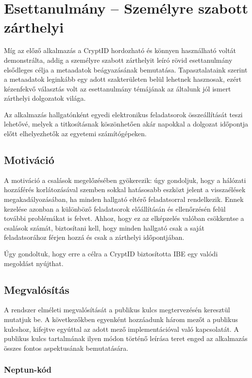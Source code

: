 \section{Esettanulmány – Személyre szabott zárthelyi}
\label{Section::Applications::Zarthelyi}

Míg az előző alkalmazás a CryptID hordozható és könnyen használható voltát demonstrálta, addig a személyre szabott zárthelyit leíró rövid esettanulmány elsődleges célja a metaadatok beágyazásának bemutatása. Tapasztalataink szerint a metaadatok leginkább egy adott szakterületen belül lehetnek hasznosak, ezért kézenfekvő választás volt az esettanulmány témájának az általunk jól ismert zárthelyi dolgozatok világa.

Az alkalmazás hallgatónként egyedi elektronikus feladatsorok összeállítását teszi lehetővé, melyek a titkosításnak köszönhetően akár napokkal a dolgozat időpontja előtt elhelyezhetők az egyetemi számítógépeken.

\subsection{Motiváció}

A motiváció a csalások megelőzésében gyökerezik: úgy gondoljuk, hogy a hálózati hozzáférés korlátozásával szemben sokkal hatásosabb eszközt jelent a visszaélések megakadályozásában, ha minden hallgató eltérő feladatsorral rendelkezik. Ennek kezelése azonban a különböző feladatsorok előállításán és ellenőrzésén felül további problémákat is felvet. Ahhoz, hogy ez az elképzelés valóban csökkentse a csalások számát, biztosítani kell, hogy minden hallgató csak a saját feladatsorához férjen hozzá és csak a zárthelyi időpontjában. 

Úgy gondoltuk, hogy erre a célra a CryptID biztosította IBE egy valódi megoldást nyújthat.

\subsection{Megvalósítás}

A rendszer elméleti megvalósítását a publikus kulcs megtervezésén keresztül mutatjuk be. A következőkben egyenként hozzáadunk három mezőt a publikus kulcshoz, kifejtve egyúttal az adott mező implementációval való kapcsolatát. A publikus kulcs tartalmának ilyen módon történő leírása teret enged az alkalmazás összes fontos aspektusának bemutatására.

\subsubsection{Neptun-kód}


